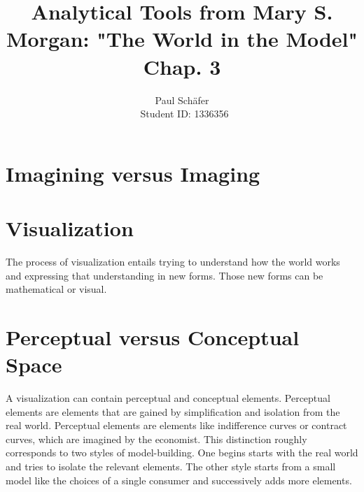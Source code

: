 \documentclass[12pt,a4paper, margin = 2.5cm]{article}
\author{Paul Sch\"afer \\\ Student ID: 1336356}
\begin{document}
\title{Analytical Tools from Mary S. Morgan: "The World in the Model" Chap. 3}
\maketitle
\section*{Imagining versus Imaging}

\section*{Visualization}
The process of visualization entails trying to understand how the world works and expressing that understanding in new forms. Those new forms can be mathematical or visual.

\section*{Perceptual versus Conceptual Space}
A visualization can contain perceptual and conceptual elements. Perceptual elements are elements that are gained by simplification and isolation from the real world. Perceptual elements are elements like indifference curves or contract curves, which are imagined by the economist. This distinction roughly corresponds to two styles of model-building. One begins starts with the real world and tries to isolate the relevant elements. The other style starts from a small model like the choices of a single consumer and successively adds more elements.  
\pagebreak

\end{document}

